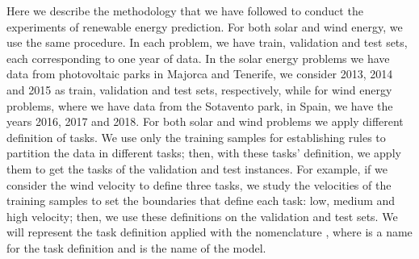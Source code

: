 %
\begin{table}[t!]
    \caption[Hyperparameters, grids used to find them (when appropriate), and hyperparameter selection method for each model.]{Hyperparameters, grids used to find them (when appropriate), and hyperparameter selection method for each model. Here, $d$ is the number of {dimensions} %
     of the data and $\sigma$ is the standard deviation of the~target.}
    \label{tab:hyperpars_grid_energies}
    \centering
\end{table}

Here we describe the methodology that we have followed to conduct the experiments of renewable energy prediction.
%
For both solar and wind energy, we use the same procedure. In each problem, we have train, validation and test sets, each corresponding to one year of data. In the solar energy problems we have data from photovoltaic parks in Majorca and Tenerife, we consider 2013, 2014 and 2015 as train, validation and test sets, respectively, while for wind energy problems, where we have data from the Sotavento park, in Spain, we have the years 2016, 2017 and 2018.
%
For both solar and wind problems we apply different definition of tasks. We use only the training samples for establishing rules to partition the data in different tasks; then, with these tasks' definition, we apply them to get the tasks of the validation and test instances.
%
For example, if we consider the wind velocity to define three tasks, we study the velocities of the training samples to set the boundaries that define each task: low, medium and high velocity; then, we use these definitions on the validation and test sets.
%
We will represent the task definition applied with the nomenclature , where  is a name for the task definition and  is the name of the model.

